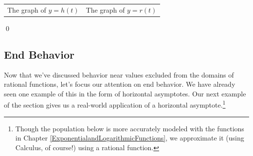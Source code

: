 \documentclass{ximera}
\begin{document}
\begin{ex}
\begin{enumerate}
\begin{center}
\begin{tabular}{cc}
The graph of $y=h(t)$  \hspace{0.75in} & The graph of $y=r(t)$ \\


\end{tabular}
\end{center} 

\end{enumerate}
\qed
\end{ex}

\subsection{End Behavior}
\label{ebrationalsection}

Now that we've  discussed behavior near values excluded from the domains of rational functions, let's focus our attention on  end behavior.  We have already seen one example of this in the form of horizontal asymptotes.  Our next example of the section gives us a real-world application of a horizontal asymptote.\footnote{Though the population below is more accurately modeled with the functions in Chapter \ref{ExponentialandLogarithmicFunctions}, we approximate it (using Calculus, of course!) using a rational function.}
\end{document}
